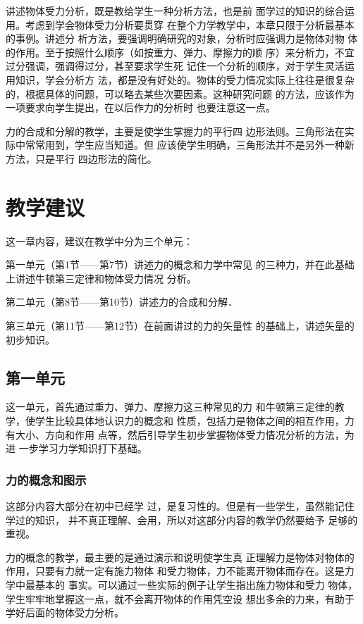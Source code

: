 讲述物体受力分析，既是教给学生一种分析方法，也是前
面学过的知识的综合运用。考虑到学会物体受力分析要贯穿
在整个力学教学中，本章只限于分析最基本的事例。讲述分
析方法，要强调明确研究的对象，分析时应强调力是物体对物
体的作用。至于按照什么顺序（如按重力、弹力、摩擦力的顺
序）来分析力，不宜过分强调，强调得过分，甚至要求学生死
记住一个分析的顺序，对于学生灵活运用知识，学会分析方
法，都是没有好处的。物体的受力情况实际上往往是很复杂
的，根据具体的问题，可以略去某些次要因素。这种研究问题
的方法，应该作为一项要求向学生提出，在以后作力的分析时
也要注意这一点。

力的合成和分解的教学，主要是使学生掌握力的平行四
边形法则。三角形法在实际中常常用到，学生应当知道。但
应该使学生明确，三角形法并不是另外一种新方法，只是平行
四边形法的简化。


\section{教学建议}
这一章内容，建议在教学中分为三个单元：

第一单元（第1节——第7节）讲述力的概念和力学中常见
的三种力，并在此基础上讲述牛顿第三定律和物体受力情况
分析。

第二单元（第8节——第10节）讲述力的合成和分解．

第三单元（第11节——第12节）在前面讲过的力的矢量性
的基础上，讲述矢量的初步知识。

\subsection{第一单元}
这一单元，首先通过重力、弹力、摩擦力这三种常见的力
和牛顿第三定律的教学，使学生比较具体地认识力的概念和
性质，包括力是物体之间的相互作用，力有大小、方向和作用
点等，然后引导学生初步掌握物体受力情况分析的方法，为进
一步学习力学知识打下基础。

\subsubsection{力的概念和图示}

这部分内容大部分在初中已经学
过，是复习性的。但是有一些学生，虽然能记住学过的知识，
并不真正理解、会用，所以对这部分内容的教学仍然要给予
足够的重视。

力的概念的教学，最主要的是通过演示和说明使学生真
正理解力是物体对物体的作用，只要有力就一定有施力物体
和受力物体，力不能离开物体而存在。这是力学中最基本的
事实。可以通过一些实际的例子让学生指出施力物体和受力
物体，学生牢牢地掌握这一点，就不会离开物体的作用凭空设
想出多余的力来，有助于学好后面的物体受力分析。


